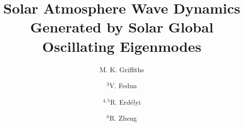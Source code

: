 \documentclass[preprint,authoryear,12pt]{elsarticle}
\begin{document}
\begin{frontmatter}





\title{Solar Atmosphere Wave Dynamics Generated by Solar Global Oscillating Eigenmodes}


\author{M. K. Griffiths}
\address{$^1$Solar Physics and Space Plasma Research Centre ($SP^{2}RC$), School of Mathematics and 
Statistics, University of Sheffield, Hicks Building, Hounsfield Road, S7 3RH, UK}
\address{$^2$Corporate Information and Computing Services, The University of Sheffield, 10-12
Brunswick Street, Sheffeld, S10 2FN, UK.}

\author{$^3$V. Fedun}
\address{$^3$Department of Automatic Control and Systems Engineering, The University of Sheffield, Mappin Street, Sheffield, S1 3JD, UK}

\author{$^{4,5}$R. Erd\'{e}lyi}
\address{$^4$Solar Physics and Space Plasma Research Centre ($SP^{2}RC$), School of Mathematics and 
Statistics, University of Sheffield, Hicks Building, Hounsfield Road, S7 3RH, UK}
\address{$^5$Department of Astronomy, E\"otv\"os Lor\'and University, P.O.Box 32, Budapest, H-1518 Hungary}

\author{$^{6}$R. Zheng}
\address{$^6$Shandong Provincial Key Laboratory of Optical Astronomy and Solar-Terrestrial Environment, and Institute of Space Sciences, Shandong University, Weihai 264209, China}


\end{frontmatter}
\end{document}
